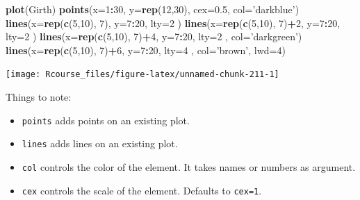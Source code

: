 \documentclass[]{book}
\newenvironment{Shaded}{\begin{snugshade}}{\end{snugshade}}
\newcommand{\KeywordTok}[1]{\textcolor[rgb]{0.13,0.29,0.53}{\textbf{#1}}}
\newcommand{\DataTypeTok}[1]{\textcolor[rgb]{0.13,0.29,0.53}{#1}}
\newcommand{\DecValTok}[1]{\textcolor[rgb]{0.00,0.00,0.81}{#1}}
\newcommand{\FloatTok}[1]{\textcolor[rgb]{0.00,0.00,0.81}{#1}}
\newcommand{\StringTok}[1]{\textcolor[rgb]{0.31,0.60,0.02}{#1}}
\newcommand{\OperatorTok}[1]{\textcolor[rgb]{0.81,0.36,0.00}{\textbf{#1}}}
\newcommand{\NormalTok}[1]{#1}
\providecommand{\tightlist}{%
  \setlength{\itemsep}{0pt}\setlength{\parskip}{0pt}}
\theoremstyle{definition}
\theoremstyle{definition}
\theoremstyle{definition}
\theoremstyle{remark}
\begin{document}
\begin{Shaded}
\begin{Highlighting}[]
\KeywordTok{plot}\NormalTok{(Girth)}
\KeywordTok{points}\NormalTok{(}\DataTypeTok{x=}\DecValTok{1}\OperatorTok{:}\DecValTok{30}\NormalTok{, }\DataTypeTok{y=}\KeywordTok{rep}\NormalTok{(}\DecValTok{12}\NormalTok{,}\DecValTok{30}\NormalTok{), }\DataTypeTok{cex=}\FloatTok{0.5}\NormalTok{, }\DataTypeTok{col=}\StringTok{'darkblue'}\NormalTok{)}
\KeywordTok{lines}\NormalTok{(}\DataTypeTok{x=}\KeywordTok{rep}\NormalTok{(}\KeywordTok{c}\NormalTok{(}\DecValTok{5}\NormalTok{,}\DecValTok{10}\NormalTok{), }\DecValTok{7}\NormalTok{), }\DataTypeTok{y=}\DecValTok{7}\OperatorTok{:}\DecValTok{20}\NormalTok{, }\DataTypeTok{lty=}\DecValTok{2}\NormalTok{ )}
\KeywordTok{lines}\NormalTok{(}\DataTypeTok{x=}\KeywordTok{rep}\NormalTok{(}\KeywordTok{c}\NormalTok{(}\DecValTok{5}\NormalTok{,}\DecValTok{10}\NormalTok{), }\DecValTok{7}\NormalTok{)}\OperatorTok{+}\DecValTok{2}\NormalTok{, }\DataTypeTok{y=}\DecValTok{7}\OperatorTok{:}\DecValTok{20}\NormalTok{, }\DataTypeTok{lty=}\DecValTok{2}\NormalTok{ )}
\KeywordTok{lines}\NormalTok{(}\DataTypeTok{x=}\KeywordTok{rep}\NormalTok{(}\KeywordTok{c}\NormalTok{(}\DecValTok{5}\NormalTok{,}\DecValTok{10}\NormalTok{), }\DecValTok{7}\NormalTok{)}\OperatorTok{+}\DecValTok{4}\NormalTok{, }\DataTypeTok{y=}\DecValTok{7}\OperatorTok{:}\DecValTok{20}\NormalTok{, }\DataTypeTok{lty=}\DecValTok{2}\NormalTok{ , }\DataTypeTok{col=}\StringTok{'darkgreen'}\NormalTok{)}
\KeywordTok{lines}\NormalTok{(}\DataTypeTok{x=}\KeywordTok{rep}\NormalTok{(}\KeywordTok{c}\NormalTok{(}\DecValTok{5}\NormalTok{,}\DecValTok{10}\NormalTok{), }\DecValTok{7}\NormalTok{)}\OperatorTok{+}\DecValTok{6}\NormalTok{, }\DataTypeTok{y=}\DecValTok{7}\OperatorTok{:}\DecValTok{20}\NormalTok{, }\DataTypeTok{lty=}\DecValTok{4}\NormalTok{ , }\DataTypeTok{col=}\StringTok{'brown'}\NormalTok{, }\DataTypeTok{lwd=}\DecValTok{4}\NormalTok{)}
\end{Highlighting}
\end{Shaded}

\texttt{[image: Rcourse\_files/figure-latex/unnamed-chunk-211-1]}

Things to note:

\begin{itemize}
\tightlist
\item
  \texttt{points} adds points on an existing plot.
\item
  \texttt{lines} adds lines on an existing plot.
\item
  \texttt{col} controls the color of the element. It takes names or
  numbers as argument.
\item
  \texttt{cex} controls the scale of the element. Defaults to
  \texttt{cex=1}.
\end{itemize}
\end{document}
